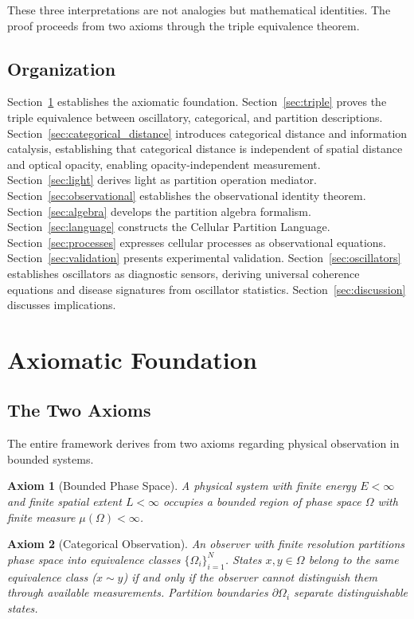 \documentclass[aps,prd,twocolumn,superscriptaddress,floatfix,nofootinbib]{revtex4-2}
\newtheorem{axiom}{Axiom}
\theoremstyle{remark}
\begin{document}
These three interpretations are not analogies but mathematical identities. The proof proceeds from two axioms through the triple equivalence theorem.

\subsection{Organization}

Section~\ref{sec:axioms} establishes the axiomatic foundation. Section~\ref{sec:triple} proves the triple equivalence between oscillatory, categorical, and partition descriptions. Section~\ref{sec:categorical_distance} introduces categorical distance and information catalysis, establishing that categorical distance is independent of spatial distance and optical opacity, enabling opacity-independent measurement. Section~\ref{sec:light} derives light as partition operation mediator. Section~\ref{sec:observational} establishes the observational identity theorem. Section~\ref{sec:algebra} develops the partition algebra formalism. Section~\ref{sec:language} constructs the Cellular Partition Language. Section~\ref{sec:processes} expresses cellular processes as observational equations. Section~\ref{sec:validation} presents experimental validation. Section~\ref{sec:oscillators} establishes oscillators as diagnostic sensors, deriving universal coherence equations and disease signatures from oscillator statistics. Section~\ref{sec:discussion} discusses implications.

\section{Axiomatic Foundation}
\label{sec:axioms}

\subsection{The Two Axioms}

The entire framework derives from two axioms regarding physical observation in bounded systems.

\begin{axiom}[Bounded Phase Space]
\label{ax:bounded}
A physical system with finite energy $E < \infty$ and finite spatial extent $L < \infty$ occupies a bounded region of phase space $\Omega$ with finite measure $\mu(\Omega) < \infty$.
\end{axiom}

\begin{axiom}[Categorical Observation]
\label{ax:categorical}
An observer with finite resolution partitions phase space into equivalence classes $\{\Omega_i\}_{i=1}^N$. States $x, y \in \Omega$ belong to the same equivalence class ($x \sim y$) if and only if the observer cannot distinguish them through available measurements. Partition boundaries $\partial \Omega_i$ separate distinguishable states.
\end{axiom}
\end{document}
